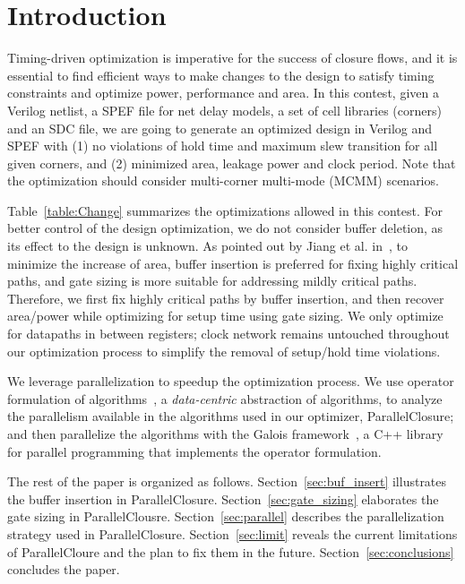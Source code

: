 \section{Introduction}
Timing-driven optimization is imperative for the success of closure flows, and it is essential to find efficient ways to make changes to the design to satisfy timing constraints and optimize power, performance and area. In this contest, given a Verilog netlist, a SPEF file for net delay models, a set of cell libraries (corners) and an SDC file, we are going to generate an optimized design in Verilog and SPEF with (1) no violations of hold time and maximum slew transition for all given corners, and (2) minimized area, leakage power and clock period. Note that the optimization should consider multi-corner multi-mode (MCMM) scenarios.

Table~\ref{table:Change} summarizes the optimizations allowed in this contest. For better control of the design optimization, we do not consider buffer deletion, as its effect to the design is unknown. As pointed out by Jiang et al. in~\cite{Jiang:Interleaving}, to minimize the increase of area, buffer insertion is preferred for fixing highly critical paths, and gate sizing is more suitable for addressing mildly critical paths. Therefore, we first fix highly critical paths by buffer insertion, and then recover area/power while optimizing for setup time using gate sizing. We only optimize for datapaths in between registers; clock network remains untouched throughout our optimization process to simplify the removal of setup/hold time violations.

We leverage parallelization to speedup the optimization process. We use operator formulation of algorithms~\cite{pingali11}, a {\em data-centric} abstraction of algorithms, to analyze the parallelism available in the algorithms used in our optimizer, ParallelClosure; and then parallelize the algorithms with the Galois framework~\cite{nguyen:2013,Lenharth:2016}, a C++ library for parallel programming that implements the operator formulation.

The rest of the paper is organized as follows. Section~\ref{sec:buf_insert} illustrates the buffer insertion in ParallelClosure. Section~\ref{sec:gate_sizing} elaborates the gate sizing in ParallelClousre. Section~\ref{sec:parallel} describes the parallelization strategy used in ParallelClosure. Section~\ref{sec:limit} reveals the current limitations of ParallelCloure and the plan to fix them in the future. Section~\ref{sec:conclusions} concludes the paper.

